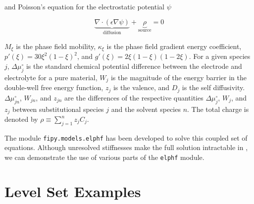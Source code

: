 \documentclass[tocAsPDFpart]{fipy}
\begin{document}
and Poisson's equation for the electrostatic potential \( \psi \)

\[ 
    \underbrace{
	\nabla\cdot\left(\epsilon\nabla\psi\right) 
    }_{\text{diffusion}}
    +
    \underbrace{
	\rho
    }_{\text{source}}
    = 0
\]

\( M_\xi \) is the phase field mobility, \( \kappa_\xi \) is the phase
field gradient energy coefficient, \( p'(\xi) =
30\xi^2\left(1-\xi\right)^2 \), and \( g'(\xi) =
2\xi\left(1-\xi\right)\left(1-2\xi\right) \).  For a given species \(
j \), \( \Delta\mu_j^{\circ} \) is the standard chemical potential
difference between the electrode and electrolyte for a pure material,
\( W_j \) is the magnitude of the energy barrier in the double-well
free energy function, \( z_j \) is the valence, and \( D_{j} \) is the
self diffusivity.  \( \Delta\mu_{jn}^{\circ} \), \( W_{jn} \), and \(
z_{jn} \) are the differences of the respective quantities \(
\Delta\mu_{j}^{\circ} \), \( W_{j} \), and \( z_{j} \) between
substitutional species \( j \) and the solvent species \( n \).  The
total charge is denoted by \( \rho \equiv \sum_{j=1}^n z_j C_j \).

The module \verb+fipy.models.elphf+ has been developed to solve this
coupled set of equations.  Although unresolved stiffnesses make the
full solution intractable in \FiPy{}, we can demonstrate the use of
various parts of the \verb+elphf+ module.




% 
% 
% 
% 


% 



\chapter{Level Set Examples}


% 

% 


\end{document}
